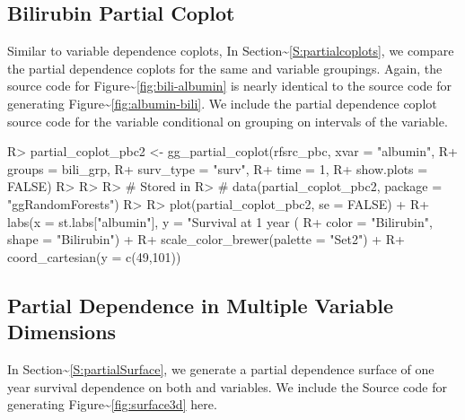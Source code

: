 \documentclass[article]{jss}
\begin{document}
{\subsection{Bilirubin Partial Coplot}\label{A:biliPartialCoplot}

Similar to variable dependence coplots, In
Section\textasciitilde{}\ref{S:partialcoplots}, we compare the partial
dependence coplots for the same  and  variable
groupings. Again, the source code for
Figure\textasciitilde{}\ref{fig:bili-albumin} is nearly identical to the
source code for generating
Figure\textasciitilde{}\ref{fig:albumin-bili}. We include the partial
dependence coplot source code for the  variable
conditional on grouping on intervals of the  variable.

\begin{Schunk}
\begin{Sinput}
R> partial_coplot_pbc2 <- gg_partial_coplot(rfsrc_pbc, xvar = "albumin",
R+                                          groups = bili_grp,
R+                                          surv_type = "surv",
R+                                          time = 1,
R+                                          show.plots = FALSE)
R> 
R> 
R> # Stored in
R> # data(partial_coplot_pbc2, package = "ggRandomForests")
R> 
R> plot(partial_coplot_pbc2, se = FALSE) +
R+   labs(x = st.labs["albumin"], y = "Survival at 1 year (%
R+        color = "Bilirubin", shape = "Bilirubin") +
R+   scale_color_brewer(palette = "Set2") +
R+   coord_cartesian(y = c(49,101))
\end{Sinput}
\end{Schunk}

\subsection{Partial Dependence in Multiple Variable Dimensions}\label{A:variableDomain}

In Section\textasciitilde{}\ref{S:partialSurface}, we generate a partial
dependence surface of one year survival dependence on both 
and  variables. We include the Source code for generating
Figure\textasciitilde{}\ref{fig:surface3d} here.

}
\end{document}
